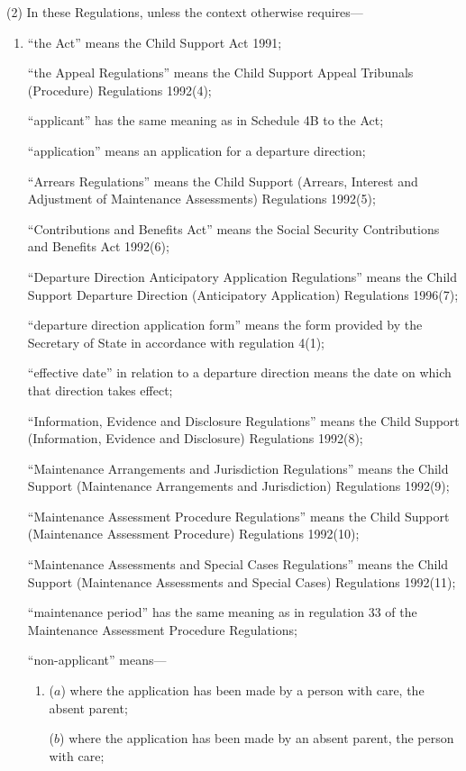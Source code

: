 \documentclass[a4paper]{article}
\begin{document}
(2) In these Regulations, unless the context otherwise requires—
\begin{enumerate}\item[]
“the Act” means the Child Support Act 1991;

“the Appeal Regulations” means the Child Support Appeal Tribunals (Procedure)
Regulations 1992(4);

“applicant” has the same meaning as in Schedule 4B to the Act;

“application” means an application for a departure direction;

“Arrears Regulations” means the Child Support (Arrears, Interest and Adjustment
of Maintenance Assessments) Regulations 1992(5);

“Contributions and Benefits Act” means the Social Security Contributions and
Benefits Act 1992(6);

“Departure Direction Anticipatory Application Regulations” means the Child
Support Departure Direction (Anticipatory Application) Regulations 1996(7);

“departure direction application form” means the form provided by the Secretary
of State in accordance with regulation 4(1);

“effective date” in relation to a departure direction means the date on which
that direction takes effect;

“Information, Evidence and Disclosure Regulations” means the Child Support
(Information, Evidence and Disclosure) Regulations 1992(8);

“Maintenance Arrangements and Jurisdiction Regulations” means the Child Support
(Maintenance Arrangements and Jurisdiction) Regulations 1992(9);

“Maintenance Assessment Procedure Regulations” means the Child Support
(Maintenance Assessment Procedure) Regulations 1992(10);

“Maintenance Assessments and Special Cases Regulations” means the Child Support
(Maintenance Assessments and Special Cases) Regulations 1992(11);

“maintenance period” has the same meaning as in regulation 33 of the Maintenance
Assessment Procedure Regulations;

“non-applicant” means—
\begin{enumerate}\item[]
($a$) where the application has been made by a person with care, the absent parent;

($b$) where the application has been made by an absent parent, the person with
care;
\end{enumerate}


\end{enumerate}
\end{document}
